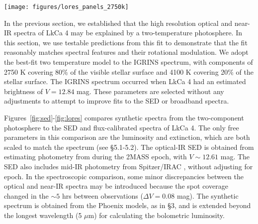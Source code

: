 \documentclass[twocolumn]{emulateapj}%
\begin{document}
\begin{figure*}
 \centering
 \texttt{[image: figures/lores\_panels\_2750k]}
 \caption{Top:  The low-resolution optical/near-IR spectrum of LkCa 4 obtained from Palomar/DBSP and APO/Triplespec on 30 December 2008 (black), compared to a synthetic spectrum of a two temperature photosphere (purple).  The inset shows that the 2750 K (red, 70\% fill factor) and 4100 K (blue, 30\% fill factor) components contribute equally to the near-IR spectrum, but the 4100 K component dominates the blue emission.  The synthetic spectrum is reddened by $A_V=0.4$ mag and scaled to the observed $J$-band spectrum. Bottom:  The low-resolution optical (left) and near-IR (right) spectrum of LkCa 4, compared with a 3900 K photosphere (blue), a 3500 K photosphere, and the two temperature photosphere that best fit the IGRINS spectrum.  The synthetic spectra are scaled separately to the optical spectrum at 0.75 $\mu$m and to the near-IR spectrum at 1.5 $\mu$m.  Warm photospheres accurately reproduce molecular bands at $0.7$ $\mu$m but fail to fit the spectral features at longer wavelengths.  Cooler photospheres predict molecular bands at $<0.7$ $\mu$m that are much deeper than observed.  The two temperature photosphere accurately fits spectral features in the optical and near-IR.}
 \label{fig:lores}
\end{figure*}



In the previous section, we established that the high resolution optical and near-IR spectra of LkCa 4 may be explained by a two-temperature photosphere.  In this section, we use testable predictions from this fit to demonstrate that the fit reasonably matches spectral features and their rotational modulation.  We adopt the best-fit two temperature model to the IGRINS spectrum, with components of 2750 K covering 80\% of the visible stellar surface and 4100 K covering 20\% of the stellar surface.  The IGRINS spectrum occurred when LkCa 4 had an estimated brightness of $V=12.84$ mag.  These parameters are selected without any adjustments to attempt to improve fits to the SED or broadband spectra.

Figures~\ref{fig:sed}-\ref{fig:lores} compares synthetic spectra from the two-component photosphere to the SED and flux-calibrated spectra of LkCa 4.  The only free parameters in this comparison are the luminosity and extinction, which are both scaled to match the spectrum (see \S 5.1-5.2).  The optical-IR SED is obtained from estimating photometry from \citet{grankin08} during the 2MASS epoch, with $V\sim12.61$ mag.  The SED also includes mid-IR photometry from Spitzer/IRAC \citep{hartmann05}, without adjusting for epoch.  In the spectroscopic comparison, some minor discrepancies between the optical and near-IR spectra may be introduced because the spot coverage changed in the $\sim 5$ hrs between observations ($\Delta V=0.08$ mag).  The synthetic spectrum is obtained from the Phoenix models, as in \S 3, and is extended beyond the longest wavelength (5 $\mu$m) for calculating the bolometric luminosity.
\end{document}
